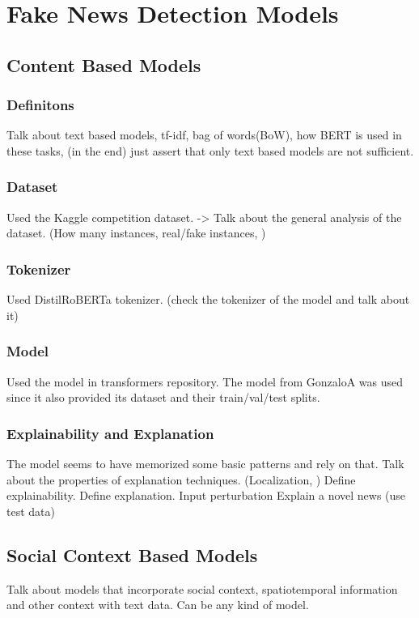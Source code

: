 
\chapter{Fake News Detection Models}\label{chapter:fnd_models}

\section{Content Based Models}

\subsection{Definitons}
Talk about text based models, tf-idf, bag of words(BoW), how BERT is used in these tasks, (in the end) just assert that only text based models are not sufficient.

\subsection{Dataset}
Used the Kaggle competition dataset.
-> Talk about the general analysis of the dataset. (How many instances, real/fake instances, )

\subsection{Tokenizer}
Used DistilRoBERTa tokenizer. (check the tokenizer of the model and talk about it)

\subsection{Model}
Used the model in transformers repository. The model from GonzaloA was used since it also provided its dataset and their train/val/test splits.

\subsection{Explainability and Explanation}
The model seems to have memorized some basic patterns and rely on that.
Talk about the properties of explanation techniques. (Localization, )
Define explainability. Define explanation.
Input perturbation
Explain a novel news (use test data)

\section{Social Context Based Models}
Talk about models that incorporate social context, spatiotemporal information and other context with text data. Can be any kind of model.

